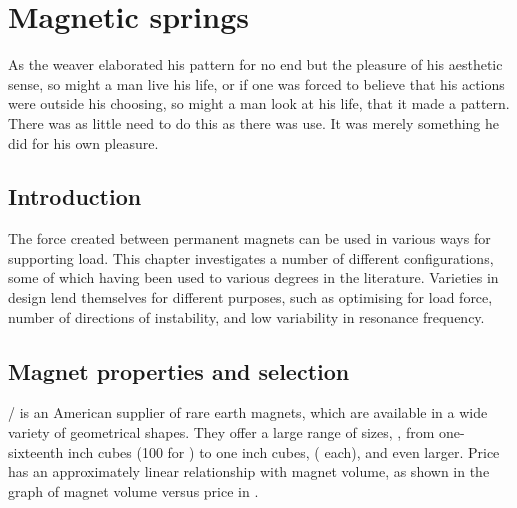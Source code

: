 \documentclass[11pt,a4paper]{memoir}
\begin{document}
\chapter{Magnetic springs}


\epigraph {
  As the weaver elaborated his pattern for no end but the pleasure of his aesthetic sense, so might a man live his life, or if one was forced to believe that his actions were outside his choosing, so might a man look at his life, that it made a pattern.
  There was as little need to do this as there was use.
  It was merely something he did for his own pleasure.
}
{\textcite{maugham1915}}

\section{Introduction}

The force created between permanent magnets can be used in various ways for supporting load.
This chapter investigates a number of different configurations, some of which having been used to various degrees in the literature.
Varieties in design lend themselves for different purposes, such as optimising for load force, number of directions of instability, and low variability in resonance frequency.


\section{Magnet properties and selection}

\KJMagnetics/  is an American supplier
of rare earth magnets, which are available in a wide variety of geometrical
shapes. They offer a large range of sizes, \eg, from one-sixteenth inch cubes
(100 for ) to one inch cubes, (
each), and even larger.  Price has an
approximately linear relationship with magnet volume, as shown in the graph of
magnet volume versus price in .
\end{document}

